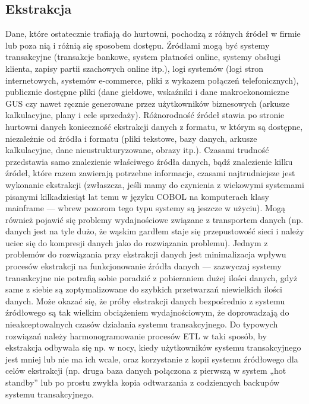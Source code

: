 \subsection{Ekstrakcja}
Dane, które ostatecznie trafiają do hurtowni, pochodzą z różnych źródeł w firmie lub poza nią i różnią się sposobem dostępu.
Źródłami mogą być systemy transakcyjne (transakcje bankowe, system płatności online, systemy obsługi klienta,
 zapisy partii szachowych online itp.), logi systemów (logi stron internetowych, systemów e-commerce,
 pliki z wykazem połączeń telefonicznych),
 publicznie dostępne pliki (dane giełdowe,
 wskaźniki i dane makroekonomiczne GUS czy nawet ręcznie generowane przez użytkowników biznesowych 
 (arkusze kalkulacyjne, plany i cele sprzedaży).
Różnorodność źródeł stawia po stronie hurtowni danych konieczność ekstrakcji danych z formatu,
 w którym są dostępne, niezależnie od źródła i formatu 
 (pliki tekstowe, bazy danych, arkusze kalkulacyjne, dane nieustrukturyzowane, obrazy itp.).
Czasami trudność przedstawia samo znalezienie właściwego źródła danych,
 bądź znalezienie kilku źródeł, które razem zawierają potrzebne informacje,
 czasami najtrudniejsze jest wykonanie ekstrakcji 
 (zwłaszcza, jeśli mamy do czynienia z wiekowymi systemami pisanymi kilkadziesiąt lat temu w języku COBOL na komputerach klasy mainframe 
 --- wbrew pozorom tego typu systemy są jeszcze w użyciu).
Mogą również pojawić się problemy wydajnościowe związane z transportem danych (np. danych jest na tyle dużo, 
 że wąskim gardłem staje się przepustowość sieci i należy uciec się do kompresji danych jako do rozwiązania problemu).
Jednym z problemów do rozwiązania przy ekstrakcji danych jest minimalizacja wpływu procesów ekstrakcji na funkcjonowanie źródła danych 
 --- zazwyczaj systemy transakcyjne nie potrafią sobie poradzić z pobieraniem dużej ilości danych, 
 gdyż same z siebie są zoptymalizowane do szybkich przetwarzań niewielkich ilości danych.
Może okazać się, że próby ekstrakcji danych bezpośrednio z systemu źródłowego są tak wielkim obciążeniem wydajnościowym,
 że doprowadzają do nieakceptowalnych czasów działania systemu transakcyjnego.
Do typowych rozwiązań należy harmonogramowanie procesów ETL w taki sposób,
 by ekstrakcja odbywała się np. w nocy, kiedy użytkowników systemu transakcyjnego jest mniej lub nie ma ich wcale, 
 oraz korzystanie z kopii systemu źródłowego dla celów ekstrakcji (np. druga baza danych połączona z pierwszą w system „hot standby” 
 lub po prostu zwykła kopia odtwarzania z codziennych backupów systemu transakcyjnego.

